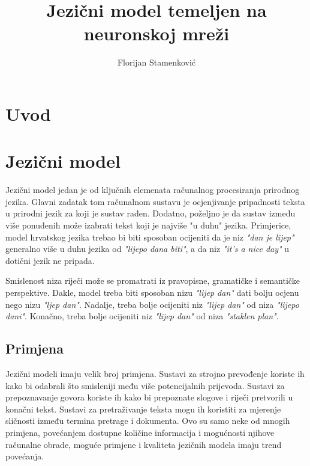 \documentclass[times, utf8, diplomski, numeric]{fer}
\begin{document}
\title{Jezični model temeljen na neuronskoj mreži}

\author{Florijan Stamenković}

\maketitle

\tableofcontents

\chapter{Uvod}


\chapter{Jezični model}

Jezični model jedan je od ključnih elemenata računalnog procesiranja prirodnog jezika. Glavni zadatak tom računalnom sustavu je ocjenjivanje pripadnosti teksta u prirodni jezik za koji je sustav rađen. Dodatno, poželjno je da sustav između više ponuđenih može izabrati tekst koji je najviše "u duhu" jezika. Primjerice, model hrvatskog jezika trebao bi biti sposoban ocijeniti da je niz \textit{"dan je lijep"} generalno više u duhu jezika od \textit{"lijepo dana biti"}, a da niz \textit{"it's a nice day"} u dotični jezik ne pripada.

Smislenost niza riječi može se promatrati iz pravopisne, gramatičke i semantičke perspektive. Dakle, model treba biti sposoban nizu \textit{"lijep dan"} dati bolju ocjenu nego nizu \textit{"ljep dan"}. Nadalje, treba bolje ocijeniti niz \textit{"lijep dan"} od niza \textit{"lijepo dani"}. Konačno, treba bolje ocijeniti niz \textit{"lijep dan"} od niza \textit{"staklen plan"}.

\section{Primjena}

Jezični modeli imaju velik broj primjena. Sustavi za strojno prevođenje koriste ih kako bi odabrali što smisleniji među više potencijalnih prijevoda. Sustavi za prepoznavanje govora koriste ih kako bi prepoznate slogove i riječi pretvorili u konačni tekst. Sustavi za pretraživanje teksta mogu ih koristiti za mjerenje sličnosti između termina pretrage i dokumenta. Ovo su samo neke od mnogih primjena, povećanjem dostupne količine informacija i mogućnosti njihove računalne obrade, moguće primjene i kvaliteta jezičnih modela imaju trend povećanja.
\end{document}
